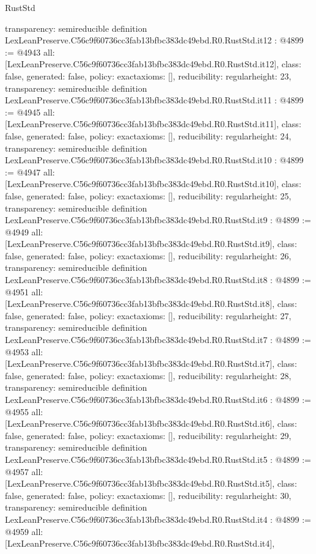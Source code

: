 \begin{lexlean}{RustStd}
\begin{coremodule}
{  transparency: semireducible
}
definition LexLeanPreserve.C56c9f60736cc3fab13bfbc383dc49ebd.R0.RustStd.it12 : @4899 := @4943 {
  all: [LexLeanPreserve.C56c9f60736cc3fab13bfbc383dc49ebd.R0.RustStd.it12],
  class: false,
  generated: false,
  policy: exact{axioms: []},
  reducibility: regular{height: 23},
  transparency: semireducible
}
definition LexLeanPreserve.C56c9f60736cc3fab13bfbc383dc49ebd.R0.RustStd.it11 : @4899 := @4945 {
  all: [LexLeanPreserve.C56c9f60736cc3fab13bfbc383dc49ebd.R0.RustStd.it11],
  class: false,
  generated: false,
  policy: exact{axioms: []},
  reducibility: regular{height: 24},
  transparency: semireducible
}
definition LexLeanPreserve.C56c9f60736cc3fab13bfbc383dc49ebd.R0.RustStd.it10 : @4899 := @4947 {
  all: [LexLeanPreserve.C56c9f60736cc3fab13bfbc383dc49ebd.R0.RustStd.it10],
  class: false,
  generated: false,
  policy: exact{axioms: []},
  reducibility: regular{height: 25},
  transparency: semireducible
}
definition LexLeanPreserve.C56c9f60736cc3fab13bfbc383dc49ebd.R0.RustStd.it9 : @4899 := @4949 {
  all: [LexLeanPreserve.C56c9f60736cc3fab13bfbc383dc49ebd.R0.RustStd.it9],
  class: false,
  generated: false,
  policy: exact{axioms: []},
  reducibility: regular{height: 26},
  transparency: semireducible
}
definition LexLeanPreserve.C56c9f60736cc3fab13bfbc383dc49ebd.R0.RustStd.it8 : @4899 := @4951 {
  all: [LexLeanPreserve.C56c9f60736cc3fab13bfbc383dc49ebd.R0.RustStd.it8],
  class: false,
  generated: false,
  policy: exact{axioms: []},
  reducibility: regular{height: 27},
  transparency: semireducible
}
definition LexLeanPreserve.C56c9f60736cc3fab13bfbc383dc49ebd.R0.RustStd.it7 : @4899 := @4953 {
  all: [LexLeanPreserve.C56c9f60736cc3fab13bfbc383dc49ebd.R0.RustStd.it7],
  class: false,
  generated: false,
  policy: exact{axioms: []},
  reducibility: regular{height: 28},
  transparency: semireducible
}
definition LexLeanPreserve.C56c9f60736cc3fab13bfbc383dc49ebd.R0.RustStd.it6 : @4899 := @4955 {
  all: [LexLeanPreserve.C56c9f60736cc3fab13bfbc383dc49ebd.R0.RustStd.it6],
  class: false,
  generated: false,
  policy: exact{axioms: []},
  reducibility: regular{height: 29},
  transparency: semireducible
}
definition LexLeanPreserve.C56c9f60736cc3fab13bfbc383dc49ebd.R0.RustStd.it5 : @4899 := @4957 {
  all: [LexLeanPreserve.C56c9f60736cc3fab13bfbc383dc49ebd.R0.RustStd.it5],
  class: false,
  generated: false,
  policy: exact{axioms: []},
  reducibility: regular{height: 30},
  transparency: semireducible
}
definition LexLeanPreserve.C56c9f60736cc3fab13bfbc383dc49ebd.R0.RustStd.it4 : @4899 := @4959 {
  all: [LexLeanPreserve.C56c9f60736cc3fab13bfbc383dc49ebd.R0.RustStd.it4],
}
\end{coremodule}
\end{lexlean}
